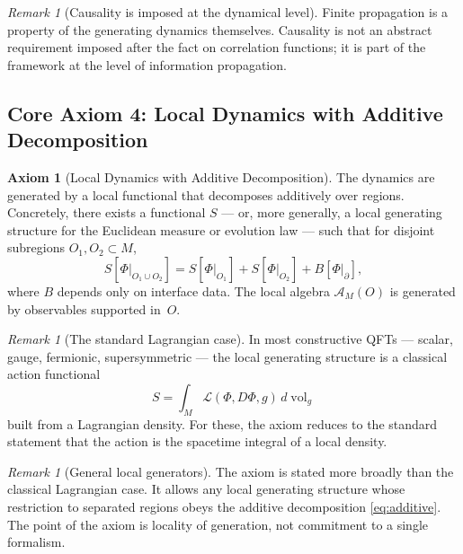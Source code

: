 \documentclass[12pt,a4paper]{article}
\theoremstyle{plain}
\theoremstyle{definition}
\newtheorem{axiom}[theorem]{Axiom}
\theoremstyle{remark}
\newtheorem{remark}[theorem]{Remark}
\newcommand{\vol}{\operatorname{vol}}
\newcommand{\alg}{\mathcal{A}}
\newcommand{\lag}{\mathcal{L}}
\begin{document}
\begin{remark}[Causality is imposed at the dynamical level]
  Finite propagation is a property of the generating dynamics
  themselves. Causality is not an abstract requirement imposed after
  the fact on correlation functions; it is part of the framework at
  the level of information propagation.
\end{remark}


\subsection{Core Axiom 4: Local Dynamics with Additive Decomposition}

\begin{axiom}[Local Dynamics with Additive Decomposition]\label{ax:action}
  The dynamics are generated by a local functional that decomposes
  additively over regions. Concretely, there exists a functional $S$
  --- or, more generally, a local generating structure for the
  Euclidean measure or evolution law --- such that for
  disjoint subregions $O_1, O_2 \subset M$,
  \begin{equation}\label{eq:additive}
    S[\Phi|_{O_1 \cup O_2}]
    = S[\Phi|_{O_1}] + S[\Phi|_{O_2}] + B[\Phi|_\partial],
  \end{equation}
  where $B$ depends only on interface data. The local algebra
  $\alg_M(O)$ is generated by observables supported in~$O$.
\end{axiom}

\begin{remark}[The standard Lagrangian case]\label{rem:lagrangian}
  In most constructive QFTs --- scalar, gauge, fermionic,
  supersymmetric --- the local generating structure is a classical
  action functional
  \begin{equation}\label{eq:classical-action}
    S = \int_M \lag(\Phi, D\Phi, g)\, d\vol_g
  \end{equation}
  built from a Lagrangian density. For these, the axiom reduces to the
  standard statement that the action is the spacetime integral of a
  local density.
\end{remark}

\begin{remark}[General local generators]\label{rem:stochastic-action}
  The axiom is stated more broadly than the classical Lagrangian case.
  It allows any local generating structure whose restriction to
  separated regions obeys the additive decomposition
  \eqref{eq:additive}. The point of the axiom is locality of
  generation, not commitment to a single formalism.
\end{remark}
\end{document}
